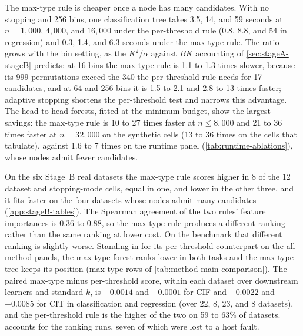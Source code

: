 The max-type rule is cheaper once a node has many candidates. With no stopping
and 256 bins, one classification tree takes 3.5, 14, and 59 seconds at
$n=1{,}000$, $4{,}000$, and $16{,}000$ under the per-threshold rule (0.8, 8.8,
and 54 in regression) and 0.3, 1.4, and 6.3 seconds under the max-type rule.
The ratio grows with the bin setting, as the $K^2/\alpha$ against $BK$
accounting of \cref{sec:stageA-stageB} predicts: at 16 bins the max-type rule
is 1.1 to 1.3 times slower, because its 999 permutations exceed the 340 the
per-threshold rule needs for 17 candidates, and at 64 and 256 bins it is 1.5
to 2.1 and 2.8 to 13 times faster; adaptive stopping shortens the
per-threshold test and narrows this advantage. The head-to-head forests, fitted at
the minimum budget, show the largest savings: the max-type rule is 10 to 27
times faster at $n\le 8{,}000$ and 21 to 36 times faster at $n=32{,}000$ on the
synthetic cells (13 to 36 times on the cells that
\citet{MilletichDownesHirst2026citrees} tabulate), against 1.6 to 7 times on
the runtime panel (\cref{tab:runtime-ablations}), whose nodes admit fewer
candidates.

On the six Stage~B real datasets the max-type rule scores higher in 8 of the
12 dataset and stopping-mode cells, equal in one, and lower in the other three,
and it fits faster on the four datasets whose nodes admit many candidates
(\cref{app:stageB-tables}). The Spearman
agreement of the two rules' feature importances is 0.36 to 0.88, so the
max-type rule produces a different ranking rather than the same ranking at
lower cost. On the benchmark that different ranking is slightly worse. Standing in for its
per-threshold counterpart on the all-method panels, the max-type forest ranks
lower in both tasks and the max-type tree keeps its position (max-type rows of
\cref{tab:method-main-comparison}). The paired max-type minus per-threshold
score, within each dataset over downstream learners and standard $k$, is
$-0.0014$ and $-0.0001$ for CIF and $-0.0022$ and $-0.0085$ for CIT in
classification and regression (over 22, 8, 23, and 8 datasets), and the
per-threshold rule is the higher of the two on 59 to 63\% of datasets.
 accounts for the ranking runs, seven of which were lost to a
host fault.

